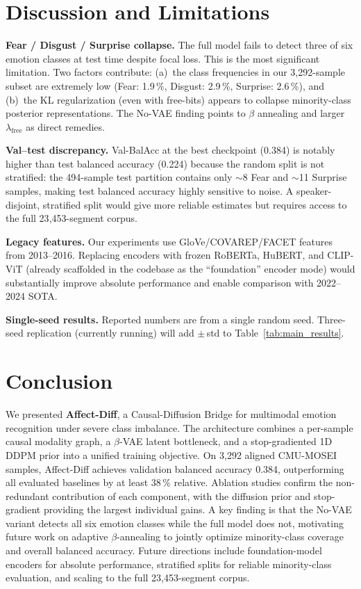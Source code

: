 \documentclass[conference]{IEEEtran}
\begin{document}
\section{Discussion and Limitations}

\textbf{Fear / Disgust / Surprise collapse.}  The full model fails to detect
three of six emotion classes at test time despite focal loss.  This is the
most significant limitation.  Two factors contribute: (a)~the class frequencies
in our 3{,}292-sample subset are extremely low (Fear: 1.9\,\%, Disgust: 2.9\,\%,
Surprise: 2.6\,\%), and (b)~the KL regularization (even with free-bits) appears
to collapse minority-class posterior representations.  The No-VAE finding
points to $\beta$ annealing and larger $\lambda_{\mathrm{free}}$ as direct
remedies.

\textbf{Val--test discrepancy.}  Val-BalAcc at the best checkpoint (0.384) is
notably higher than test balanced accuracy (0.224) because the random split is
not stratified: the 494-sample test partition contains only $\sim$8 Fear and
$\sim$11 Surprise samples, making test balanced accuracy highly sensitive to
noise.  A speaker-disjoint, stratified split would give more reliable estimates
but requires access to the full 23{,}453-segment corpus.

\textbf{Legacy features.}  Our experiments use GloVe/COVAREP/FACET features
from 2013--2016.  Replacing encoders with frozen RoBERTa, HuBERT, and CLIP-ViT
(already scaffolded in the codebase as the ``foundation'' encoder mode) would
substantially improve absolute performance and enable comparison with
2022--2024 SOTA.

\textbf{Single-seed results.}  Reported numbers are from a single random seed.
Three-seed replication (currently running) will add $\pm$\,std to
Table~\ref{tab:main_results}.

\section{Conclusion}

We presented \textbf{Affect-Diff}, a Causal-Diffusion Bridge for multimodal
emotion recognition under severe class imbalance.  The architecture combines a
per-sample causal modality graph, a $\beta$-VAE latent bottleneck, and a
stop-gradiented 1D DDPM prior into a unified training objective.  On 3{,}292
aligned CMU-MOSEI samples, Affect-Diff achieves validation balanced accuracy
0.384, outperforming all evaluated baselines by at least 38\,\% relative.
Ablation studies confirm the non-redundant contribution of each component,
with the diffusion prior and stop-gradient providing the largest individual
gains.  A key finding is that the No-VAE variant detects all six emotion
classes while the full model does not, motivating future work on adaptive
$\beta$-annealing to jointly optimize minority-class coverage and overall
balanced accuracy.  Future directions include foundation-model encoders for
absolute performance, stratified splits for reliable minority-class evaluation,
and scaling to the full 23{,}453-segment corpus.
\end{document}
